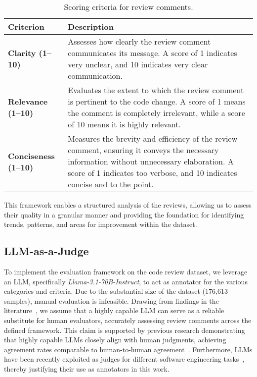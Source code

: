 \begin{table}[!t]
  \centering
  \caption{Scoring criteria for review comments.}
  \label{tab:criteria}
  \begin{tabularx}{\linewidth}{lX}
    \toprule
    \textbf{Criterion} & \textbf{Description} \\
    \midrule
    \textbf{Clarity (1--10)} & Assesses how clearly the review comment communicates its message. A score of 1 indicates very unclear, and 10 indicates very clear communication. \\
    \textbf{Relevance (1--10)} & Evaluates the extent to which the review comment is pertinent to the code change. A score of 1 means the comment is completely irrelevant, while a score of 10 means it is highly relevant. \\
    \textbf{Conciseness (1--10)} & Measures the brevity and efficiency of the review comment, ensuring it conveys the necessary information without unnecessary elaboration. A score of 1 indicates too verbose, and 10 indicates concise and to the point. \\
    \bottomrule
  \end{tabularx}
  \vspace{-1em}
\end{table}


This framework enables a structured analysis of the reviews, allowing us to assess their quality in a granular manner and providing the foundation for identifying trends, patterns, and areas for improvement within the dataset.


\subsection{LLM-as-a-Judge}

To implement the evaluation framework on the code review dataset, we leverage an LLM, specifically \emph{Llama-3.1-70B-Instruct}, to act as annotator for the various categories and criteria. Due to the substantial size of the dataset (176,613 samples), manual evaluation is infeasible. Drawing from findings in the literature~\cite{zheng2023judging, zhuo2023ice, chang2024survey}, we assume that a highly capable LLM can serve as a reliable substitute for human evaluators, accurately assessing review comments across the defined framework.
This claim is supported by previous research demonstrating that highly capable LLMs closely align with human judgments, achieving agreement rates comparable to human-to-human agreement~\cite{zheng2024judging, li2023alpacaeval}. Furthermore, LLMs have been recently exploited as judges for different software engineering tasks~\cite{zhuo2023ice, weyssow2024codeultrafeedback}, thereby justifying their use as annotators in this work.

